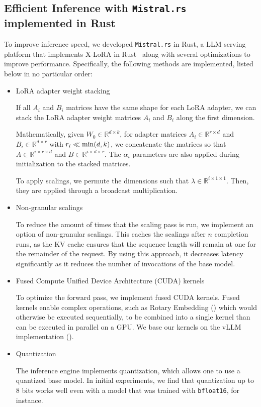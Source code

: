 \documentclass{article}
\begin{document}
\subsection{Efficient Inference with \texttt{Mistral.rs} implemented in Rust}
To improve inference speed, we developed \texttt{Mistral.rs} in Rust, a LLM serving platform that implements X-LoRA in Rust~\cite{matsakis2014rust} along with several optimizations to improve performance. Specifically, the following methods are implemented, listed below in no particular order:
\begin{itemize}
    \item LoRA adapter weight stacking
    
        If all $A_i$ and $B_i$ matrices have the same shape for each LoRA adapter, we can stack the LoRA adapter weight matrices $A_i$ and $B_i$ along the first dimension. 
        
        Mathematically, given $W_0 \in \mathbb{R}^{d \times k}$, for adapter matrices $A_i \in \mathbb{R}^{r \times d}$ and $B_i \in \mathbb{R}^{d \times r}$ with $r_i \ll {\rm min} (d,k)$, we concatenate the matrices so that $A\in \mathbb{R}^{i \times r \times d}$ and $B\in \mathbb{R}^{i \times d \times r}$. The $\alpha_i$ parameters are also applied during initialization to the stacked matrices. 

        To apply scalings, we permute the dimensions such that $\lambda \in \mathbb{R} ^ {i \times 1 \times 1}$. Then, they are applied through a broadcast multiplication.
    
    \item Non-granular scalings

        To reduce the amount of times that the scaling pass is run, we implement an option of non-granular scalings. This caches the scalings after $n$ completion runs, as the KV cache ensures that the sequence length will remain at one for the remainder of the request. By using this approach, it decreases latency significantly as it reduces the number of invocations of the base model.
        
    \item Fused Compute Unified Device Architecture (CUDA) kernels

        To optimize the forward pass, we implement fused CUDA kernels. Fused kernels enable complex operations, such as Rotary Embedding (\cite{su2021roformer}) which would otherwise be executed sequentially, to be combined into a single kernel than can be executed in parallel on a GPU. We base our kernels on the vLLM implementation (\cite{kwon2023efficient}).

    \item Quantization

        The inference engine implements quantization, which allows one to use a quantized base model. In initial experiments, we find that quantization up to 8 bits works well even with a model that was trained with \texttt{bfloat16}, for instance.  
    
\end{itemize}
\end{document}

